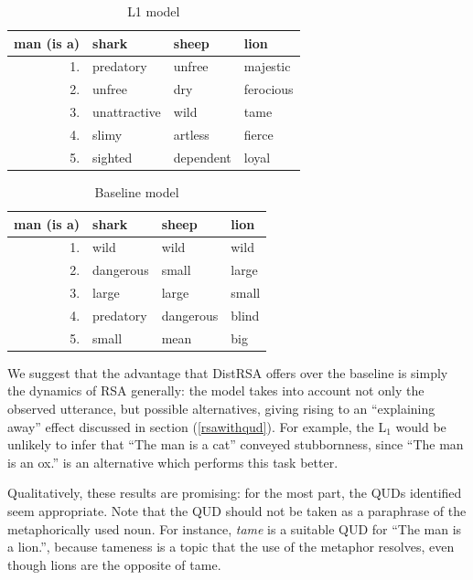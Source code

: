 \documentclass[10pt,letterpaper,twocolumn]{article}
\begin{document}


\begin{table}[ht]
	\label{tab:l1}
	\caption{L1 model}
	\centering
	\begin{tabular}{rlll}
	man (is a) & shark & sheep & lion \\\toprule
	1. & predatory & unfree & majestic \\
	2. & unfree & dry & ferocious \\
	3. & unattractive & wild & tame \\
	4. & slimy & artless & fierce \\
	5. & sighted & dependent & loyal \\\bottomrule
	\end{tabular}
\end{table}

\begin{table}[ht]
	\label{tab:baseline}
	\caption{Baseline model}
	\centering
	\begin{tabular}{rlll}
	man (is a) & shark & sheep & lion \\\toprule
	1. & wild & wild & wild \\
	2. & dangerous & small & large \\
	3. & large & large & small \\
	4. & predatory & dangerous & blind \\
	5. & small & mean & big \\\bottomrule
	\end{tabular}
\end{table}



We suggest that the advantage that DistRSA offers over the baseline is simply the dynamics of RSA generally: the model takes into account not only the observed utterance, but possible alternatives, giving rising to an ``explaining away'' effect discussed in section (\ref{rsawithqud}). For example, the L$_1$ would be unlikely to infer that ``The man is a cat'' conveyed stubbornness, since ``The man is an ox.'' is an alternative which performs this task better.

Qualitatively, these results are promising: for the most part, the QUDs identified seem appropriate. Note that the QUD should not be taken as a paraphrase of the metaphorically used noun. For instance, \emph{tame} is a suitable QUD for ``The man is a lion.'', because tameness is a topic that the use of the metaphor resolves, even though lions are the opposite of tame. 
\end{document}
